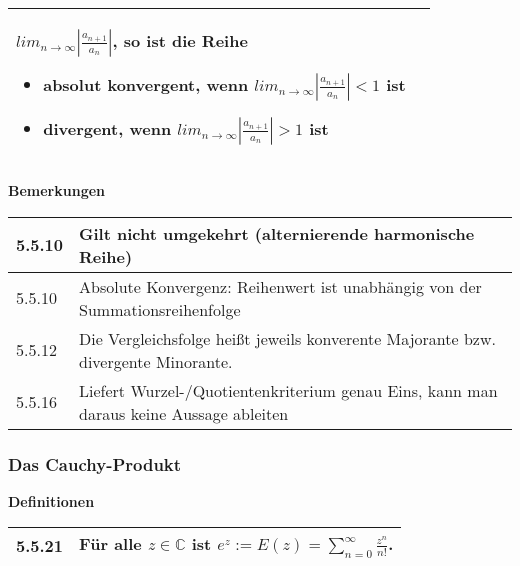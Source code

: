 \begin{table}[H]
\begin{tabularx}{\textwidth}{X m{16cm}}
\begin{itemize}[topsep=-0.5cm]
                            $lim_{n \rightarrow \infty} |\frac{a_{n+1}}{a_n}|$, so ist die Reihe
                            \begin{itemize}[topsep=-0.5cm]
                                \item absolut konvergent, wenn $lim_{n \rightarrow \infty} |\frac{a_{n+1}}{a_n}| < 1$ ist
                                \item divergent, wenn $lim_{n \rightarrow \infty} |\frac{a_{n+1}}{a_n}| > 1$ ist
                            \end{itemize}
                \end{itemize} \vspace{-0cm} \\

        \bottomrule
    \end{tabularx}
    \end{table}

    \noindent
    \textbf{Bemerkungen}
    \begin{table}[H]
    \begin{tabularx}{\textwidth}{X m{16cm}}
        \toprule

        5.5.10& Gilt nicht umgekehrt (alternierende harmonische Reihe)  \\
        \midrule
        5.5.10& Absolute Konvergenz: Reihenwert ist unabhängig von der Summationsreihenfolge \\
        \midrule
        5.5.12& Die Vergleichsfolge heißt jeweils konverente Majorante bzw. divergente Minorante. \\
        \midrule
        5.5.16& Liefert Wurzel-/Quotientenkriterium genau Eins, kann man daraus keine Aussage ableiten \\

        \bottomrule
    \end{tabularx}
    \end{table}

\subsubsection{Das Cauchy-Produkt}
\noindent
\textbf{Definitionen}
\begin{table}[H]  
\begin{tabularx}{\textwidth}{X m{16cm}}
    \toprule

    5.5.21& Für alle $z \in \mathbb{C}$ ist $e^z:= E(z) = \sum\limits^{\infty}_{n=0} \frac{z^n}{n!}$. \\

    \bottomrule

\end{tabularx}
\end{table}

